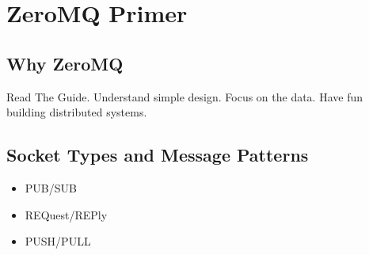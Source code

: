 \chapter{ZeroMQ Primer}
\label{zeromq_primer}

\section{Why ZeroMQ}

Read The Guide.
Understand simple design.
Focus on the data.
Have fun building distributed systems.

\section{Socket Types and Message Patterns}

\begin{itemize}
\item PUB/SUB
\item REQuest/REPly
\item PUSH/PULL
\end{itemize}
